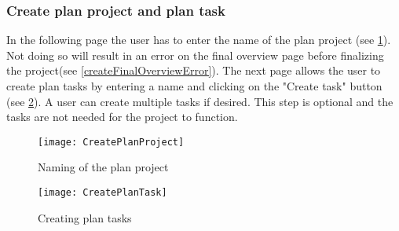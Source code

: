 \subsubsection{Create plan project and plan task}
In the following page the user has to enter the name of the plan project (see \ref{createPlanProject}). Not doing so will result in an error on the final overview page before finalizing the project(see \ref{createFinalOverviewError}). The next page allows the user to create plan tasks by entering a name and clicking on the "Create task" button (see \ref{createPlanTask}). A user can create multiple tasks if desired. This step is optional and the tasks are not needed for the project to function.

\begin{figure}[H]
	\centering
	\texttt{[image: CreatePlanProject]}
	\caption{Naming of the plan project}
	\label{createPlanProject}
\end{figure}
\begin{figure}[H]
	\centering
	\texttt{[image: CreatePlanTask]}
	\caption{Creating plan tasks}
	\label{createPlanTask}
\end{figure}

